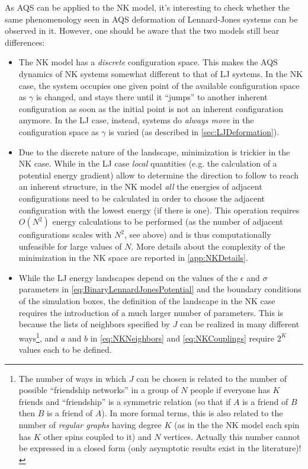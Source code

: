 As AQS can be applied to the NK model, it's interesting to check whether the same phenomenology seen in AQS deformation of Lennard-Jones systems can be observed in it. However, one should be aware that the two models still bear differences:

\begin{itemize}
	\item The NK model has a \emph{discrete} configuration space. This makes the AQS dynamics of NK systems somewhat different to that of LJ systems. In the NK case, the system occupies one given point of the available configuration space as $\gamma$ is changed, and stays there until it ``jumps'' to another inherent configuration as soon as the initial point is not an inherent configuration anymore. In the LJ case, instead, systems do \emph{always move} in the configuration space as $\gamma$ is varied (as described in \autoref{sec:LJDeformation}).
	\item Due to the discrete nature of the landscape, minimization is trickier in the NK case. While in the LJ case \emph{local} quantities (e.g. the calculation of a potential energy gradient) allow to determine the direction to follow to reach an inherent structure, in the NK model \emph{all} the energies of adjacent configurations need to be calculated in order to choose the adjacent configuration with the lowest energy (if there is one). This operation requires $O(N^{2})$ energy calculations to be performed (as the number of adjacent configurations scales with $N^{2}$, see above) and is thus computationally unfeasible for large values of $N$. More details about the complexity of the minimization in the NK space are reported in \autoref{app:NKDetails}.
	\item While the LJ energy landscapes depend on the values of the $\epsilon$ and $\sigma$ parameters in \autoref{eq:BinaryLennardJonesPotential} and the boundary conditions of the simulation boxes, the definition of the landscape in the NK case requires the introduction of a much larger number of parameters. This is because the lists of neighbors specified by $J$ can be realized in many different ways\footnote{The number of ways in which $J$ can be chosen is related to the number of possible ``friendship networks'' in a group of $N$ people if everyone has $K$ friends and ``friendship'' is a symmetric relation (so that if $A$ is a friend of $B$ then $B$ is a friend of $A$). In more formal terms, this is also related to the number of \emph{regular graphs} having degree $K$ (as in the the NK model each spin has $K$ other spins coupled to it) and $N$ vertices. Actually this number cannot be expressed in a closed form (only asymptotic results exist in the literature)!}, and $a$ and $b$ in \autoref{eq:NKNeighbors} and \autoref{eq:NKCouplings} require $2^{K}$ values each to be defined.
\end{itemize}

